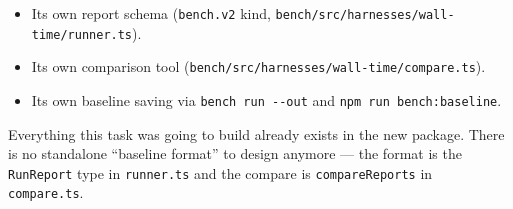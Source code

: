 \begin{itemize}
\tightlist
\item
  Its own report schema (\texttt{b\allowbreak{}e\allowbreak{}n\allowbreak{}c\allowbreak{}h\allowbreak{}.\allowbreak{}v\allowbreak{}2} kind, \texttt{b\allowbreak{}e\allowbreak{}n\allowbreak{}c\allowbreak{}h\allowbreak{}/\allowbreak{}s\allowbreak{}r\allowbreak{}c\allowbreak{}/\allowbreak{}h\allowbreak{}a\allowbreak{}r\allowbreak{}n\allowbreak{}e\allowbreak{}s\allowbreak{}s\allowbreak{}e\allowbreak{}s\allowbreak{}/\allowbreak{}w\allowbreak{}a\allowbreak{}l\allowbreak{}l\allowbreak{}-\allowbreak{}t\allowbreak{}i\allowbreak{}m\allowbreak{}e\allowbreak{}/\allowbreak{}r\allowbreak{}u\allowbreak{}n\allowbreak{}n\allowbreak{}e\allowbreak{}r\allowbreak{}.\allowbreak{}t\allowbreak{}s}).
\item
  Its own comparison tool (\texttt{b\allowbreak{}e\allowbreak{}n\allowbreak{}c\allowbreak{}h\allowbreak{}/\allowbreak{}s\allowbreak{}r\allowbreak{}c\allowbreak{}/\allowbreak{}h\allowbreak{}a\allowbreak{}r\allowbreak{}n\allowbreak{}e\allowbreak{}s\allowbreak{}s\allowbreak{}e\allowbreak{}s\allowbreak{}/\allowbreak{}w\allowbreak{}a\allowbreak{}l\allowbreak{}l\allowbreak{}-\allowbreak{}t\allowbreak{}i\allowbreak{}m\allowbreak{}e\allowbreak{}/\allowbreak{}c\allowbreak{}o\allowbreak{}m\allowbreak{}p\allowbreak{}a\allowbreak{}r\allowbreak{}e\allowbreak{}.\allowbreak{}t\allowbreak{}s}).
\item
  Its own baseline saving via \texttt{b\allowbreak{}e\allowbreak{}n\allowbreak{}c\allowbreak{}h\allowbreak{} \allowbreak{}r\allowbreak{}u\allowbreak{}n\allowbreak{} \allowbreak{}-\allowbreak{}-\allowbreak{}o\allowbreak{}u\allowbreak{}t} and \texttt{n\allowbreak{}p\allowbreak{}m\allowbreak{} \allowbreak{}r\allowbreak{}u\allowbreak{}n\allowbreak{} \allowbreak{}b\allowbreak{}e\allowbreak{}n\allowbreak{}c\allowbreak{}h\allowbreak{}:\allowbreak{}b\allowbreak{}a\allowbreak{}s\allowbreak{}e\allowbreak{}l\allowbreak{}i\allowbreak{}n\allowbreak{}e}.
\end{itemize}

Everything this task was going to build already exists in the new package. There is no standalone ``baseline format'' to design anymore --- the format is the \texttt{R\allowbreak{}u\allowbreak{}n\allowbreak{}R\allowbreak{}e\allowbreak{}p\allowbreak{}o\allowbreak{}r\allowbreak{}t} type in \texttt{r\allowbreak{}u\allowbreak{}n\allowbreak{}n\allowbreak{}e\allowbreak{}r\allowbreak{}.\allowbreak{}t\allowbreak{}s} and the compare is \texttt{c\allowbreak{}o\allowbreak{}m\allowbreak{}p\allowbreak{}a\allowbreak{}r\allowbreak{}e\allowbreak{}R\allowbreak{}e\allowbreak{}p\allowbreak{}o\allowbreak{}r\allowbreak{}t\allowbreak{}s} in \texttt{c\allowbreak{}o\allowbreak{}m\allowbreak{}p\allowbreak{}a\allowbreak{}r\allowbreak{}e\allowbreak{}.\allowbreak{}t\allowbreak{}s}.

